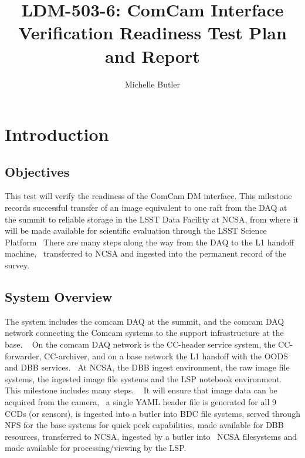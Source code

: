 \documentclass[DM,lsstdraft,STR,toc]{lsstdoc}
\begin{document}
\def\milestoneName{LDM-503-6 ComCam interface verification readiness}
\def\milestoneId{LVV-P50}
\def\product{Data Management}


\title{LDM-503-6: ComCam Interface Verification Readiness Test Plan and Report}
\setDocRef{\lsstDocType-\lsstDocNum}
\date{\vcsdate}
\author{ Michelle Butler }






\maketitle

\section{Introduction}
\label{sect:intro}


\subsection{Objectives}
\label{sect:objectives}

 This test will verify the readiness of the ComCam DM interface. This
milestone records successful transfer of an image equivalent to one raft
from the DAQ at the summit to reliable storage in the LSST Data Facility
at NCSA, from where it will be made available for scientific evaluation
through the LSST Science Platform ~There are many steps along the way
from the DAQ to the L1 handoff machine, ~transferred to NCSA and
ingested into the permanent record of the survey. ~~



\subsection{System Overview}
\label{sect:systemoverview}

 The system includes the comcam DAQ at the summit, and the comcam DAQ
network connecting the Comcam systems to the support infrastructure at
the base. ~ On the comcam DAQ network is the CC-header service system,
the CC-forwarder, CC-archiver, and on a base network the L1 handoff with
the OODS and DBB services. ~At NCSA, the DBB ingest environment, the raw
image file systems, the ingested image file systems and the LSP notebook
environment. ~ This milestone includes many steps. ~ It will ensure that
image data can be acquired from the camera, ~a single YAML header file
is generated for all 9 CCDs (or sensors), is ingested into a butler into
BDC file systems, served through NFS for the base systems for quick peek
capabilities, made available for DBB resources, transferred to NCSA,
ingested by a butler into ~NCSA filesystems and made available for
processing/viewing by the LSP. ~\\[2\baselineskip]
\end{document}
